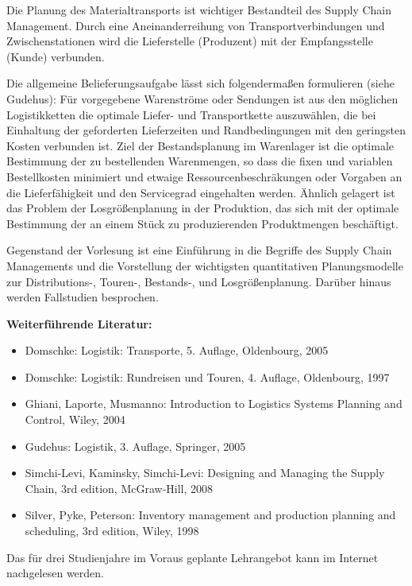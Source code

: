 \begin{course}
\begin{learningoutcomes}
\end{learningoutcomes}

\begin{content}
Die Planung des Materialtransports ist wichtiger Bestandteil des Supply Chain Management. Durch eine Aneinanderreihung von Transportverbindungen und Zwischenstationen wird die Lieferstelle (Produzent) mit der Empfangsstelle (Kunde) verbunden.

 

Die allgemeine Belieferungsaufgabe lässt sich folgendermaßen formulieren (siehe Gudehus): Für vorgegebene Warenströme oder Sendungen ist aus den möglichen Logistikketten die optimale Liefer- und Transportkette auszuwählen, die bei Einhaltung der geforderten Lieferzeiten und Randbedingungen mit den geringsten Kosten verbunden ist. Ziel der Bestandsplanung im Warenlager ist die optimale Bestimmung der zu bestellenden Warenmengen, so dass die fixen und variablen Bestellkosten minimiert und etwaige Ressourcenbeschräkungen oder Vorgaben an die Lieferfähigkeit und den Servicegrad eingehalten werden. Ähnlich gelagert ist das Problem der Losgrößenplanung in der Produktion, das sich mit der optimale Bestimmung der an einem Stück zu produzierenden Produktmengen beschäftigt.

 

Gegenstand der Vorlesung ist eine Einführung in die Begriffe des Supply Chain Managements und die Vorstellung der wichtigsten quantitativen Planungsmodelle zur Distributions-, Touren-, Bestands-, und Losgrößenplanung. Darüber hinaus werden Fallstudien besprochen.


\end{content}



\begin{literature}\textbf{Weiterführende Literatur:}

 \begin{itemize}\item Domschke: Logistik: Transporte, 5. Auflage, Oldenbourg, 2005  \item Domschke: Logistik: Rundreisen und Touren, 4. Auflage, Oldenbourg, 1997  \item Ghiani, Laporte, Musmanno: Introduction to Logistics Systems Planning and Control, Wiley, 2004  \item Gudehus: Logistik, 3. Auflage, Springer, 2005  \item Simchi-Levi, Kaminsky, Simchi-Levi: Designing and Managing the Supply Chain, 3rd edition, McGraw-Hill, 2008  \item Silver, Pyke, Peterson: Inventory management and production planning and scheduling, 3rd edition, Wiley, 1998  \end{itemize}\end{literature}

\begin{remarks}Das für drei Studienjahre im Voraus geplante Lehrangebot kann im Internet nachgelesen werden.

\end{remarks}

\end{course}